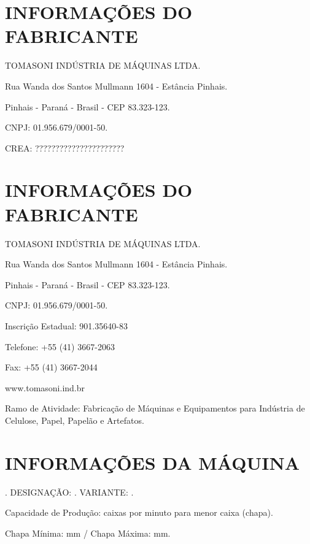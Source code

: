 
\thispagestyle{fancy}

\vspace*{\fill}

\section{\large{INFORMAÇÕES DO FABRICANTE}}

TOMASONI INDÚSTRIA DE MÁQUINAS LTDA.

Rua Wanda dos Santos Mullmann 1604 - Estância Pinhais.

Pinhais - Paraná - Brasil - CEP 83.323-123.

CNPJ: 01.956.679/0001-50.

CREA: ??????????????????????
\thispagestyle{fancy}

\vspace*{\fill}

\section{\large{INFORMAÇÕES DO FABRICANTE}}

TOMASONI INDÚSTRIA DE MÁQUINAS LTDA.

Rua Wanda dos Santos Mullmann 1604 - Estância Pinhais.

Pinhais - Paraná - Brasil - CEP 83.323-123.

CNPJ: 01.956.679/0001-50.

Inscrição Estadual: 901.35640-83

Telefone: +55 (41) 3667-2063

Fax: +55 (41) 3667-2044

www.tomasoni.ind.br

Ramo de Atividade: Fabricação de Máquinas e Equipamentos para Indústria de Celulose, Papel, Papelão e Artefatos.

\vspace{40 pt}

\section{\large{INFORMAÇÕES DA MÁQUINA}}


\machineName \space. DESIGNAÇÃO: \machineShortName. VARIANTE: \variant.

Capacidade de Produção: \productionCapacityminimumSheet \space caixas por minuto para menor caixa (chapa).

Chapa Mínima: \minimumSheet mm / Chapa Máxima: \maximumSheet mm.

